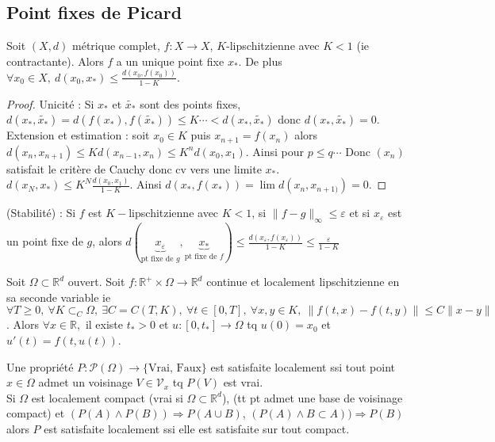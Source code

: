 \subsection{Point fixes de Picard}
\begin{propriete}
    Soit $(X,d)$ métrique complet, $f:X\to X$, $K$-lipschitzienne avec $K<1$ (ie contractante). Alors $f$ a un unique point fixe $x_*$. De plus $\forall x_0\in X,\ d(x_0,x_*)\le \frac{d(x_0,f(x_0))}{1-K}.$
\end{propriete}
\begin{proof}
    Unicité : Si $x_*$ et $\tilde{x_*}$ sont des points fixes, $d(x_*,\tilde{x_*})=d(f(x_*),f(\tilde{x_*}))\le K\cdots<d(x_*,\tilde{x_*})$ donc $d(x_*,\tilde{x_*})=0$.\\
    Extension et estimation : soit $x_0\in K$ puis $x_{n+1}=f(x_{n})$ alors $d(x_{n}, x_{n+1})\le Kd(x_{n-1},x_{n})\le K^nd(x_0,x_1)$. Ainsi pour $p\le q\cdots$
    Donc $(x_{n})$ satisfait le critère de Cauchy donc cv vers une limite $x_*.$ $d(x_N,x_*)\le K^N\frac{d(x_0,x_1)}{1-K}$. Ainsi $d(x_*,f(x_*))=\lim d(x_{n},x_{n+1)})=0$.
\end{proof}
\begin{remarque}
    (Stabilité) : Si $f$ est $K-$lipschitzienne avec $K<1$, si $\|f-g\|_\infty \le \varepsilon $ et si $x_\varepsilon $ est un point fixe de $g$, alors $d(\underbrace{x_\varepsilon }_{\text{pt fixe de }g},\underbrace{x_*}_{\text{pt fixe de }f})\le \frac{d(x_\varepsilon ,f(x_\varepsilon ))}{1-K}\le \frac{\varepsilon}{1-K}$
\end{remarque}
\begin{theoreme} 

Soit $\Omega\subset \mathbb{R} ^d$ ouvert. Soit $f:\mathbb{R} ^+\times \Omega\to \mathbb{R} ^d$ continue et localement lipschitzienne en sa seconde variable ie $\forall T\ge 0,\ \forall K\subset _C\Omega,\ \exists C=C(T,K),\ \forall t\in [0,T],\ \forall x,y\in K,\  \|f(t,x)-f(t,y)\|\le C\|x-y\|$. Alors $\forall x\in \mathbb{R} , $ il existe $t_*>0$ et $u:[0,t_*]\to \Omega$ tq $u(0)=x_0$ et $u'(t)=f(t,u(t))$.
\end{theoreme}
\begin{remarque}
    Une propriété $P:\mathcal{P}(\Omega)\to \{\text{Vrai, Faux}\} $ est satisfaite localement ssi tout point $x\in \Omega$ admet un voisinage $V\in \mathcal{V}_x$ tq $P(V)$ est vrai. \\Si $\Omega$ est localement compact (vrai si $\Omega\subset \mathbb{R} ^d$), (tt pt admet une base de voisinage compact) et $(P(A)\wedge P(B))\Rightarrow P(A\cup B)$, $(P(A)\wedge  B\subset A))\Rightarrow P(B)$ alors $P$ est satisfaite localement ssi elle est satisfaite sur tout compact.
\end{remarque}
